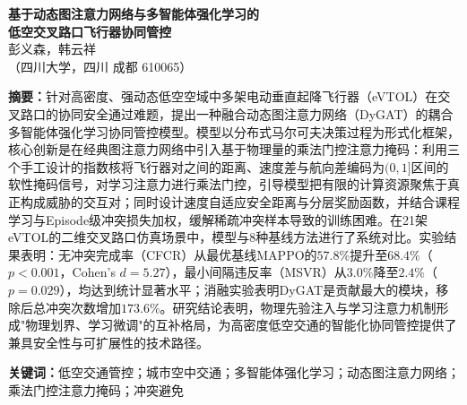 \documentclass[12pt,a4paper,UTF8]{ctexart}
\begin{document}
\begin{center}
    {\LARGE\textbf{基于动态图注意力网络与多智能体强化学习的\\[2pt]低空交叉路口飞行器协同管控}}\\[10pt]
    {\large 彭义森，韩云祥}\\[4pt]
    {\small （四川大学，四川 成都 610065）}
\end{center}

\vspace{8pt}
\noindent\textbf{摘\quad 要：}针对高密度、强动态低空空域中多架电动垂直起降飞行器（eVTOL）在交叉路口的协同安全通过难题，提出一种融合动态图注意力网络（DyGAT）的耦合多智能体强化学习协同管控模型。模型以分布式马尔可夫决策过程为形式化框架，核心创新是在经典图注意力网络中引入基于物理量的乘法门控注意力掩码：利用三个手工设计的指数核将飞行器对之间的距离、速度差与航向差编码为$(0,1]$区间的软性掩码信号，对学习注意力进行乘法门控，引导模型把有限的计算资源聚焦于真正构成威胁的交互对；同时设计速度自适应安全距离与分层奖励函数，并结合课程学习与Episode级冲突损失加权，缓解稀疏冲突样本导致的训练困难。在21架eVTOL的二维交叉路口仿真场景中，模型与8种基线方法进行了系统对比。实验结果表明：无冲突完成率（CFCR）从最优基线MAPPO的$57.8\%$提升至$68.4\%$（$p<0.001$，Cohen's $d=5.27$），最小间隔违反率（MSVR）从$3.0\%$降至$2.4\%$（$p=0.029$），均达到统计显著水平；消融实验表明DyGAT是贡献最大的模块，移除后总冲突次数增加$173.6\%$。研究结论表明，物理先验注入与学习注意力机制形成"物理划界、学习微调"的互补格局，为高密度低空交通的智能化协同管控提供了兼具安全性与可扩展性的技术路径。

\vspace{6pt}
\noindent\textbf{关键词：}低空交通管控；城市空中交通；多智能体强化学习；动态图注意力网络；乘法门控注意力掩码；冲突避免
\end{document}
